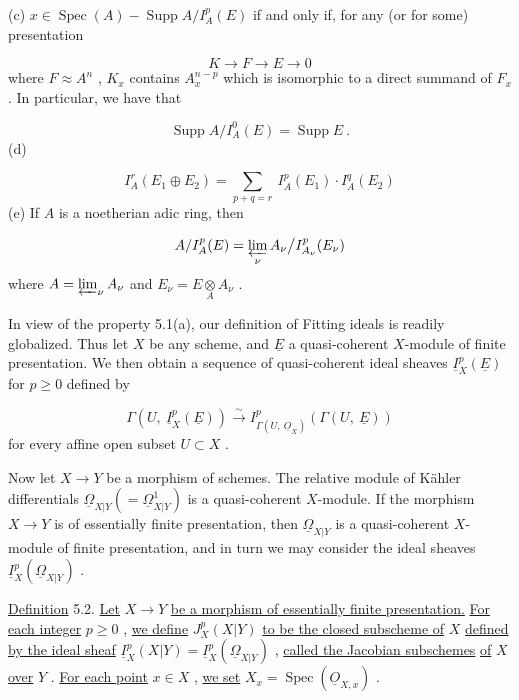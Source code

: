 (c)  $x \in \operatorname{Spec}(A) - \operatorname{Supp} A/I_A^p(E)$  if and only if, for any (or for some) presentation

\begin{equation*}
K \to F \to E \to 0
\end{equation*}
where  $F \approx A^n$ , $K_x$  contains  $A_x^{n-p}$  which is isomorphic to a direct summand of $F_x$ . In particular, we have that

\begin{equation*}
\operatorname{Supp} A/I_A^0(E) = \operatorname{Supp} E \ .
\end{equation*}
(d)

\begin{equation*}
I_A^r(E_1 \oplus E_2) = \sum_{p+q=r} \ I_A^p(E_1) \cdot I_A^q(E_2)
\end{equation*}
(e)  If  $A$  is a noetherian adic ring, then

\begin{equation*}
A/I_A^p(E) = \varprojlim_{\nu} A_\nu \big/ I_{A_\nu}^p (E_\nu)
\end{equation*}
where  $A = \varprojlim_{\nu} A_\nu$  and  $E_\nu = E \underset{A}{\otimes} A_\nu$ .

In view of the property 5.1(a), our definition of Fitting ideals is readily globalized. Thus let  $X$  be any scheme, and  $\underline{E}$  a quasi-coherent $X$-module of finite presentation. We then obtain a sequence of quasi-coherent ideal sheaves $\underline{I}_X^p(\underline{E})$  for  $p \geq 0$  defined by

\begin{equation*}
\Gamma(U, \ \underline{I}_X^p(\underline{E})) \xrightarrow{\sim} I^p_{\Gamma(U, \ \underline{O}_X)}(\Gamma(U, \ \underline{E}))
\end{equation*}
for every affine open subset  $U \subset X$ .

Now let  $X \to Y$  be a morphism of schemes. The relative module of Kähler differentials $\underline{\Omega}_{X|Y}(= \underline{\Omega}^1_{X|Y})$  is a quasi-coherent $X$-module. If the morphism  $X \to Y$  is of essentially finite presentation, then  $\underline{\Omega}_{X|Y}$  is a quasi-coherent $X$-module of finite presentation, and in turn we may consider the ideal sheaves  $\underline{I}_X^p(\underline{\Omega}_{X|Y})$  .

\underline{Definition} 5.2.  \underline{Let}  $X \to Y$  \underline{be a morphism of essentially finite presentation.} \underline{For each integer}  $p \geq 0$ , \underline{we define}  $J_X^p(X|Y)$  \underline{to be the closed subscheme of}  $X$
\underline{defined by the ideal sheaf}  $\underline{I}_X^p(X|Y) = \underline{I}_X^p(\underline{\Omega}_{X|Y})$ , \underline{called the Jacobian subschemes} \underline{of}  $X$  \underline{over}  $Y$ . \underline{For each point}  $x \in X$ , \underline{we set}  $X_x = \operatorname{Spec}(\underline{O}_{X,x})$ .

